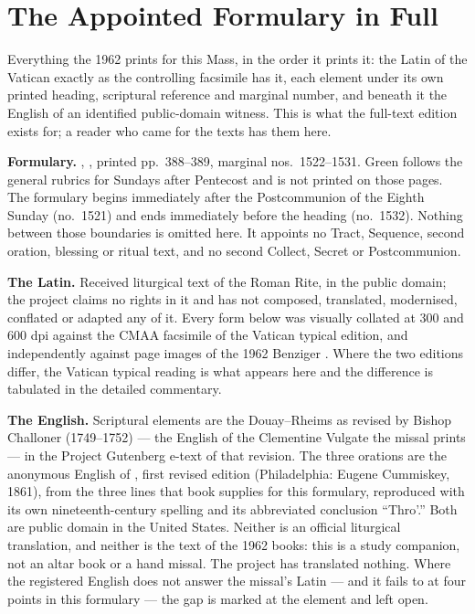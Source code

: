 \section*{The Appointed Formulary in Full}

Everything the 1962  prints for this Mass, in the order
it prints it: the Latin of the Vatican  exactly as the
controlling facsimile has it, each element under its own printed heading,
scriptural reference and marginal number, and beneath it the English of an
identified public-domain witness. This is what the full-text edition exists
for; a reader who came for the texts has them here.

\textbf{Formulary.} , , printed pp.~388--389, marginal nos.\ 1522--1531. Green follows the
general rubrics for Sundays after Pentecost and is not printed on those pages.
The formulary begins immediately after the Postcommunion of the Eighth Sunday
(no.\ 1521) and ends immediately before the heading  (no.\ 1532). Nothing between those boundaries is omitted
here. It appoints no Tract, Sequence, second oration, blessing or ritual text,
and no second Collect, Secret or Postcommunion.

\textbf{The Latin.} Received liturgical text of the Roman Rite, in the public
domain; the project claims no rights in it and has not composed, translated,
modernised, conflated or adapted any of it. Every form below was visually
collated at 300 and 600 dpi against the CMAA facsimile of the Vatican typical
edition, and independently against page images of the 1962 Benziger
. Where the two editions differ, the Vatican
typical reading is what appears here and the difference is tabulated in the
detailed commentary.

\textbf{The English.} Scriptural elements are the Douay--Rheims as revised by
Bishop Challoner (1749--1752) --- the English of the Clementine Vulgate the
missal prints --- in the Project Gutenberg e-text of that revision. The three
orations are the anonymous English of , first revised edition
(Philadelphia: Eugene Cummiskey, 1861), from the three lines that book
supplies for this formulary, reproduced with its own nineteenth-century
spelling and its abbreviated conclusion ``Thro'.'' Both are public domain in
the United States. Neither is an official liturgical translation, and neither
is the text of the 1962 books: this is a study companion, not an altar book or
a hand missal. The project has translated nothing. Where the registered
English does not answer the missal's Latin --- and it fails to at four points
in this formulary --- the gap is marked at the element and left open.

